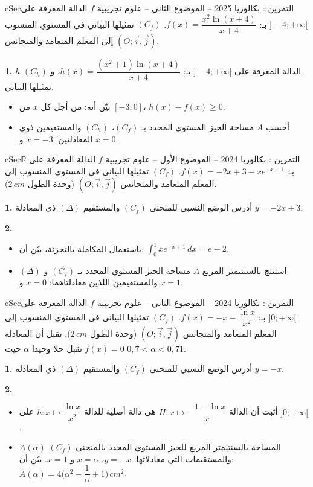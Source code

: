 \documentclass[12pt,a4paper]{article}
\newenvironment{BOX}[2]{\begin{otherlanguage}{english}\begin{arbox}{#1}{#2}}{\end{arbox}\end{otherlanguage}}
\newcounter{exo}
\newenvironment{tamrin}[1]{\stepcounter{exo}\begin{BOX}{cSec}{التمرين \theexo: #1}}{\end{BOX}}
\newcommand{\R}{\mathbb{R}}
\newenvironment{sq}{\begin{itemize}[leftmargin=2.4em,itemsep=3pt]}{\end{itemize}}
\newcommand{\qa}{\item[(أ)]}\newcommand{\qb}{\item[(ب)]}\newcommand{\qc}{\item[(جـ)]}\newcommand{\qd}{\item[(د)]}\newcommand{\qe}{\item[(هـ)]}
\newcommand{\QQ}[1]{\par\smallskip\textbf{#1.} }
\begin{document}
\begin{tamrin}{بكالوريا 2025 -- الموضوع الثاني -- علوم تجريبية}
$f$ الدالة المعرفة على $]-4;+\infty[$ بـ: $f(x)=\dfrac{x^2\ln(x+4)}{x+4}$.
$(C_f)$ تمثيلها البياني في المستوي المنسوب إلى المعلم المتعامد والمتجانس $(O;\vec i,\vec j)$.
\QQ{1} $h$ الدالة المعرفة على $]-4;+\infty[$ بـ: $h(x)=\dfrac{(x^2+1)\ln(x+4)}{x+4}$، و $(C_h)$ تمثيلها البياني.
\begin{sq}
\qa بيّن أنه: من أجل كل $x$ من $[-3;0]$، $h(x)-f(x)\ge0$.
\qb أحسب $A$ مساحة الحيز المستوي المحدد بـ $(C_f)$، $(C_h)$ والمستقيمين ذوي المعادلتين: $x=-3$ و $x=0$.
\end{sq}
\end{tamrin}

\begin{tamrin}{بكالوريا 2024 -- الموضوع الأول -- علوم تجريبية}
$f$ الدالة المعرفة على $\R$ بـ: $f(x)=-2x+3-xe^{-x+1}$.
$(C_f)$ تمثيلها البياني في المستوي المنسوب إلى المعلم المتعامد والمتجانس $(O;\vec i,\vec j)$ (وحدة الطول $2\,cm$).
\QQ{1} أدرس الوضع النسبي للمنحنى $(C_f)$ والمستقيم $(\Delta)$ ذي المعادلة $y=-2x+3$.
\QQ{2}
\begin{sq}
\qa باستعمال المكاملة بالتجزئة، بيّن أن: $\displaystyle\int_0^1xe^{-x+1}\,dx=e-2$.
\qb استنتج بالسنتيمتر المربع $A$ مساحة الحيز المستوي المحدد بـ $(C_f)$ و $(\Delta)$ والمستقيمين اللذين معادلتاهما: $x=0$ و $x=1$.
\end{sq}
\end{tamrin}

\begin{tamrin}{بكالوريا 2024 -- الموضوع الثاني -- علوم تجريبية}
$f$ الدالة المعرفة على $]0;+\infty[$ بـ: $f(x)=-x-\dfrac{\ln x}{x^2}$.
$(C_f)$ تمثيلها البياني في المستوي المنسوب إلى المعلم المتعامد والمتجانس $(O;\vec i,\vec j)$ (وحدة الطول $2\,cm$).
نقبل أن المعادلة $f(x)=0$ تقبل حلا وحيدا $\alpha$ حيث $0{,}7<\alpha<0{,}71$.
\QQ{1} أدرس الوضع النسبي للمنحنى $(C_f)$ والمستقيم $(\Delta)$ ذي المعادلة $y=-x$.
\QQ{2}
\begin{sq}
\qa أثبت أن الدالة $H:x\mapsto\dfrac{-1-\ln x}{x}$ هي دالة أصلية للدالة $h:x\mapsto\dfrac{\ln x}{x^2}$ على $]0;+\infty[$.
\qb $A(\alpha)$ المساحة بالسنتيمتر المربع للحيز المستوي المحدد بالمنحنى $(C_f)$ والمستقيمات التي معادلاتها: $y=-x$، $x=\alpha$ و $x=1$.
بيّن أن: $A(\alpha)=4\Big(\alpha^2-\dfrac1\alpha+1\Big)\,cm^2$.
\end{sq}
\end{tamrin}
\end{document}
